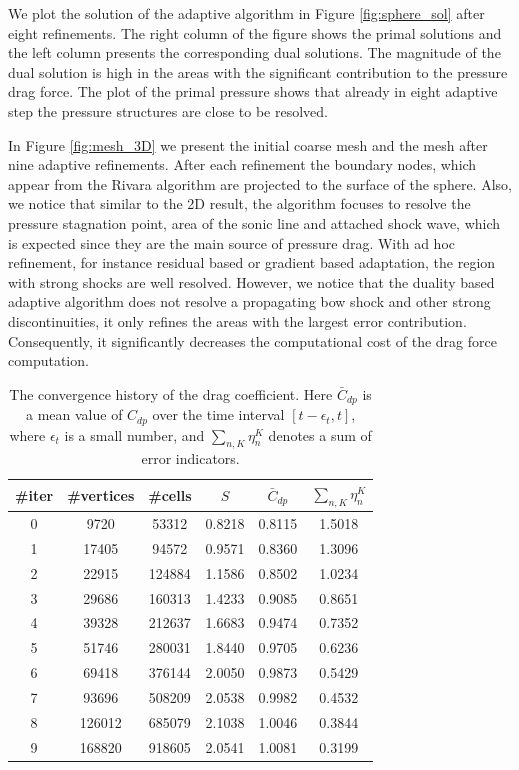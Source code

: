 We plot the solution of the adaptive algorithm in Figure \ref{fig:sphere_sol}
after
eight refinements. The right column of the figure shows the primal solutions and
the left column presents the corresponding dual solutions. The magnitude of the
dual solution is high in the areas with the significant contribution to the
pressure drag force. The plot of the primal pressure shows that already in
eight adaptive step the pressure structures are close to be resolved.

In Figure \ref{fig:mesh_3D} we present the initial coarse mesh and the mesh
after nine adaptive refinements. After each refinement the boundary nodes,
which appear from the Rivara algorithm are projected to the surface
of the sphere. Also, we notice that similar to the 2D result, the algorithm
focuses
to resolve the pressure stagnation point, area of the sonic line and
attached shock wave, which is expected since they are the main source of
pressure drag. With ad hoc refinement, for instance residual
based or gradient based adaptation, the region with strong shocks are well
resolved. However, we notice that the duality based adaptive algorithm does not
resolve a propagating bow shock and other strong discontinuities, it only
refines the areas with the largest error contribution. Consequently,	 it
significantly decreases the computational cost of the drag force computation.

\begin{table}[ht]
\caption{The convergence history of the drag coefficient. 
Here $\bar C_{dp}$ is a mean value of $C_{dp}$ over the time interval
$[t-\epsilon_t, t]$, where $\epsilon_t$ is a small number, and
$\displaystyle\sum_{n, K}\eta_n^K$ denotes a sum of error indicators.}
\centering
\begin{tabular}{ c | c | c | c | c | c  }
\hline
\#iter & \#vertices & \#cells & $S$ &   $\bar C_{dp}$ &
$\displaystyle\sum_{n,K}\eta_n^K$ \\
  \hline 
0 &9720&  53312 &0.8218        &0.8115          &1.5018 \\
1&17405&  94572 &0.9571        &0.8360          &1.3096 \\
2&22915&  124884 &1.1586         &0.8502         &1.0234 \\
3&29686&  160313 &1.4233         &0.9085         &0.8651 \\
4&39328&  212637 &1.6683         &0.9474         &0.7352 \\
5&51746&  280031 &1.8440         &0.9705         &0.6236 \\
6&69418&  376144 &2.0050         &0.9873         &0.5429 \\
7&93696&  508209 &2.0538         &0.9982         &0.4532 \\
8&  126012&  685079 &2.1038      &1.0046         &0.3844 \\
9& 168820 & 918605 & 2.0541      &1.0081         & 0.3199 \\
\hline 
 \end{tabular}\label{table:sphere}
\end{table}
 
